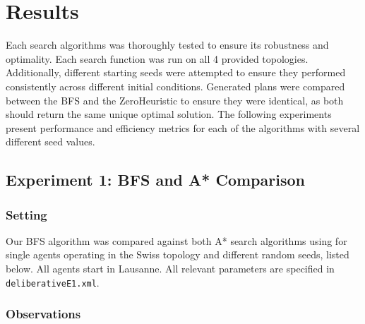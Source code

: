 \documentclass[11pt]{article}
\begin{document}
\section{Results}
Each search algorithms was thoroughly tested to ensure its robustness and optimality. Each search function was run on all 4 provided topologies. Additionally, different starting seeds were attempted to ensure they performed consistently across different initial conditions. Generated plans were compared between the BFS and the ZeroHeuristic to ensure they were identical, as both should return the same unique optimal solution. The following experiments present performance and efficiency metrics for each of the algorithms with several different seed values. 
\subsection{Experiment 1: BFS and A* Comparison}
\subsubsection{Setting}
Our BFS algorithm was compared against both A* search algorithms using for single agents operating in the Swiss topology and different random seeds, listed below. All agents start in Lausanne. All relevant parameters are specified in \texttt{deliberativeE1.xml}. 

\subsubsection{Observations}
\end{document}
